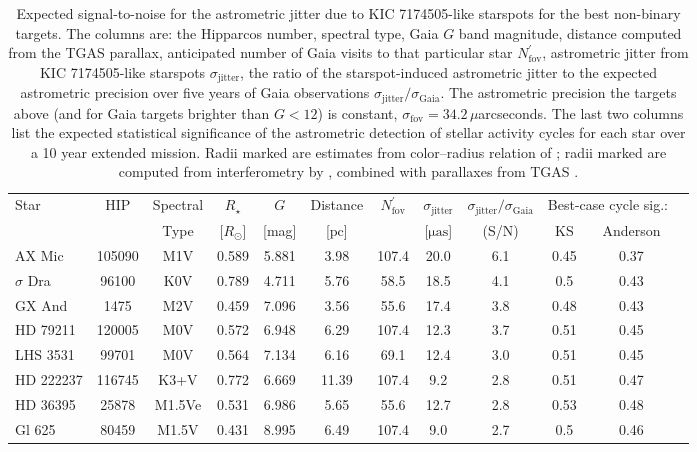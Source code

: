 \begin{table}
\begin{tabular}{lccccccccccc}
Star & HIP & Spectral & $R_\star$ & $G$ & Distance & $N^\prime_{\mathrm{fov}}$ & $\sigma_{\mathrm{jitter}}$ & $\sigma_{\mathrm{jitter}}/\sigma_{\mathrm{Gaia}}$ & \multicolumn{2}{c}{Best-case cycle sig.:} \\ 
 &  & Type & [$R_\odot$] & [mag] & [$\mathrm{pc}$] & & [$\mathrm{\mu as}$] & (S/N) & KS & Anderson\\ \hline\hline
AX Mic & 105090 & M1V & 0.589\tablenotemark{a} & 5.881 & 3.98 & 107.4 & 20.0 & 6.1 & 0.45 & 0.37 \\
$\sigma$ Dra & 96100 & K0V & 0.789\tablenotemark{a} & 4.711 & 5.76 & 58.5 & 18.5 & 4.1 & 0.5 & 0.43 \\
GX And & 1475 & M2V & 0.459\tablenotemark{b} & 7.096 & 3.56 & 55.6 & 17.4 & 3.8 & 0.48 & 0.43 \\
HD 79211 & 120005 & M0V & 0.572\tablenotemark{b} & 6.948 & 6.29 & 107.4 & 12.3 & 3.7 & 0.51 & 0.45 \\
LHS 3531 & 99701 & M0V & 0.564\tablenotemark{a} & 7.134 & 6.16 & 69.1 & 12.4 & 3.0 & 0.51 & 0.45 \\
HD 222237 & 116745 & K3+V & 0.772\tablenotemark{a} & 6.669 & 11.39 & 107.4 & 9.2 & 2.8 & 0.51 & 0.47 \\
HD 36395 & 25878 & M1.5Ve & 0.531\tablenotemark{b} & 6.986 & 5.65 & 55.6 & 12.7 & 2.8 & 0.53 & 0.48 \\
Gl 625 & 80459 & M1.5V & 0.431\tablenotemark{a} & 8.995 & 6.49 & 107.4 & 9.0 & 2.7 & 0.5 & 0.46 \\
\end{tabular}
\caption{Expected signal-to-noise for the astrometric jitter due to KIC 7174505-like starspots for the best non-binary targets. The columns are: the Hipparcos number, spectral type, Gaia $G$ band magnitude, distance computed from the TGAS parallax, anticipated number of Gaia visits to that particular star $N^\prime_{\mathrm{fov}}$, astrometric jitter from KIC 7174505-like starspots $\sigma_{\mathrm{jitter}}$,  the ratio of the starspot-induced astrometric jitter to the expected astrometric precision over five years of Gaia observations $\sigma_{\mathrm{jitter}}/\sigma_{\mathrm{Gaia}}$. The astrometric precision the targets above (and for Gaia targets brighter than $G < 12$) is constant, $\sigma_{\mathrm{fov}} = 34.2 \,\mu$arcseconds. The last two columns list the expected statistical significance of the astrometric detection of stellar activity cycles for each star over a 10 year extended mission. Radii marked  are estimates from color--radius relation of \citet{boyajian2012}; radii marked  are computed from interferometry by \citet{boyajian2012}, combined with parallaxes from TGAS \citep{Michalik2015}.
\label{tab:stars}}
\end{table}


